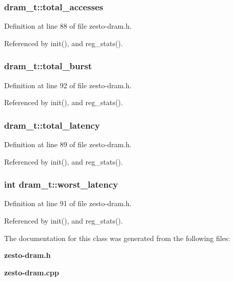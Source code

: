 \subsubsection[{total\_\-accesses}]{ {\bf dram\_\-t::total\_\-accesses}\hspace{0.3cm}{\tt  [protected]}}\label{classdram__t_c73284ed2db86d534bf059595a3dc02e}




Definition at line 88 of file zesto-dram.h.

Referenced by init(), and reg\_\-stats().
\subsubsection[{total\_\-burst}]{ {\bf dram\_\-t::total\_\-burst}\hspace{0.3cm}{\tt  [protected]}}\label{classdram__t_770d947ea35f647fbbada7b018de118e}




Definition at line 92 of file zesto-dram.h.

Referenced by init(), and reg\_\-stats().
\subsubsection[{total\_\-latency}]{ {\bf dram\_\-t::total\_\-latency}\hspace{0.3cm}{\tt  [protected]}}\label{classdram__t_e72364ac76111abb711daeb104ad9ef1}




Definition at line 89 of file zesto-dram.h.

Referenced by init(), and reg\_\-stats().
\subsubsection[{worst\_\-latency}]{\setlength{\rightskip}{0pt plus 5cm}int {\bf dram\_\-t::worst\_\-latency}\hspace{0.3cm}{\tt  [protected]}}\label{classdram__t_922f4a801b44a15c391b1edcd4ab3572}




Definition at line 91 of file zesto-dram.h.

Referenced by init(), and reg\_\-stats().

The documentation for this class was generated from the following files:\begin{CompactItemize}
\item 
{\bf zesto-dram.h}\item 
{\bf zesto-dram.cpp}\end{CompactItemize}
